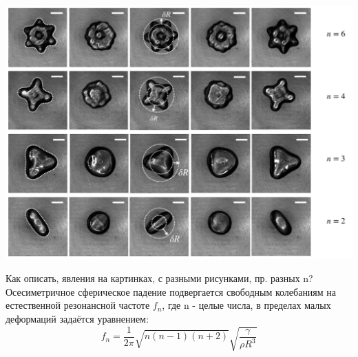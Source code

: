  \begin{frame}{}
 \vspace{0.2cm}
   \includegraphics[width=\linewidth]{tex/conclusao/IMG_7598.jpg}
 \end{frame}
 \begin{frame}{}
 \vspace{1.5cm}
 \begin{block}{Как описать, явления на картинках, с разными рисунками, пр. разных n?}
 Осесиметричное сферическое падение подвергается свободным колебаниям на естественной резонансной частоте \(f_{n}\), где n - целые числа, в пределах малых деформаций задаётся уравнением:
 \[f_{n}= \frac{1}{2\pi}\sqrt{n\left(n-1\right)\left(n+2\right)}\sqrt{\frac{\gamma}{\rho R^{3}}}\]
  
 \end{block}
 \end{frame}